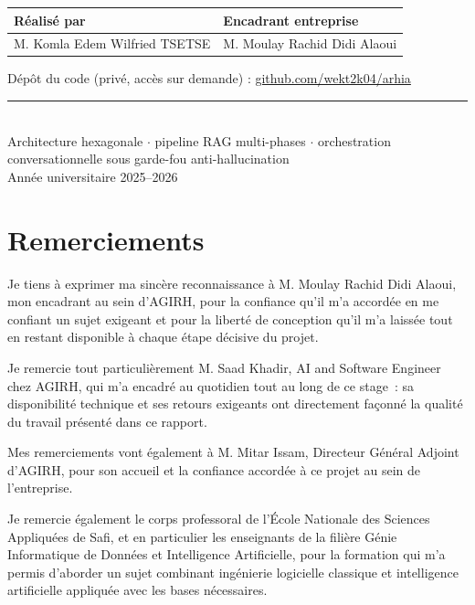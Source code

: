 \documentclass[12pt,a4paper]{article}
\begin{document}
\begin{center}
  \vspace{0.5cm}
  {\small
  \begin{tabularx}{0.75\textwidth}{@{}X X@{}}
    \toprule
    \textbf{R\'ealis\'e par} & \textbf{Encadrant entreprise} \\
    \midrule
    M. Komla Edem Wilfried TSETSE & M. Moulay Rachid Didi Alaoui \\
    \bottomrule
  \end{tabularx}
  }

  \vspace{0.4cm}
  {\small D\'ep\^ot du code (priv\'e, acc\`es sur demande) : \href{https://github.com/wekt2k04/arhia}{github.com/wekt2k04/arhia}}

  \vfill
  \textcolor{arhiaindigo}{\rule{0.35\textwidth}{0.6pt}}\\[4pt]
  {\footnotesize\color{arhiagray} Architecture hexagonale $\cdot$ pipeline RAG multi-phases $\cdot$ orchestration conversationnelle sous garde-fou anti-hallucination}\\[6pt]
  {\footnotesize\color{arhiagray} Ann\'ee universitaire 2025--2026}
  \vspace{0.5cm}
\end{center}
\newpage

\section*{Remerciements}

Je tiens \`a exprimer ma sinc\`ere reconnaissance \`a M. Moulay Rachid Didi Alaoui, mon encadrant au sein d'AGIRH, pour la confiance qu'il m'a accord\'ee en me confiant un sujet exigeant et pour la libert\'e de conception qu'il m'a laiss\'ee tout en restant disponible \`a chaque \'etape d\'ecisive du projet.

Je remercie tout particuli\`erement M. Saad Khadir, AI and Software Engineer chez AGIRH, qui m'a encadr\'e au quotidien tout au long de ce stage~: sa disponibilit\'e technique et ses retours exigeants ont directement fa\c{c}onn\'e la qualit\'e du travail pr\'esent\'e dans ce rapport.

Mes remerciements vont \'egalement \`a M. Mitar Issam, Directeur G\'en\'eral Adjoint d'AGIRH, pour son accueil et la confiance accord\'ee \`a ce projet au sein de l'entreprise.

Je remercie \'egalement le corps professoral de l'\'Ecole Nationale des Sciences Appliqu\'ees de Safi, et en particulier les enseignants de la fili\`ere G\'enie Informatique de Donn\'ees et Intelligence Artificielle, pour la formation qui m'a permis d'aborder un sujet combinant ing\'enierie logicielle classique et intelligence artificielle appliqu\'ee avec les bases n\'ecessaires.
\end{document}
